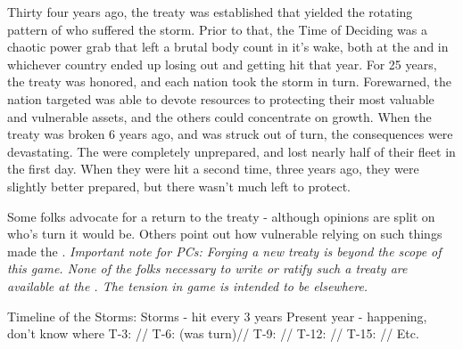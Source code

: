 \documentclass[blue]{GL2020}
\begin{document}
Thirty four years ago, the treaty was established that yielded the rotating pattern of who suffered the storm. Prior to that, the Time of Deciding was a chaotic power grab that left a brutal body count in it's wake, both at the \pSchool{} and in whichever country ended up losing out and getting hit that year. For 25 years, the treaty was honored, and each nation took the storm in turn. Forewarned, the nation targeted was able to devote resources to protecting their most valuable and vulnerable assets, and the others could concentrate on growth. When the treaty was broken 6 years ago, and \pShip{} was struck out of turn, the consequences were devastating. The \pShippies{} were completely unprepared, and lost nearly half of their fleet in the first day. When they were hit a second time, three years ago, they were slightly better prepared, but there wasn't much left to protect.

Some folks advocate for a return to the treaty - although opinions are split on who's turn it would be. Others point out how vulnerable relying on such things made the \pShip{}. \emph{Important note for PCs: Forging a new treaty is beyond the scope of this game. None of the folks necessary to write or ratify such a treaty are available at the \pSchool{}. The tension in game is intended to be elsewhere.}

Timeline of the Storms:
Storms - hit every 3 years
Present year - happening, don’t know where
T-3: \pShip{}//
T-6: \pShip{} (was \pTech{} turn)//
T-9: \pFarm{}//
T-12: \pShip{}//
T-15: \pTech{}//
Etc.
\end{document}
